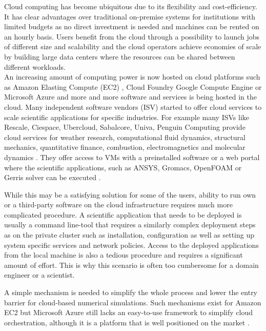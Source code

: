 \documentclass[3p,times]{elsarticle}
\begin{document}
Cloud computing has become ubiquitous due to its flexibility and cost-efficiency. It has clear advantages over traditional on-premise systems for institutions with limited budgets as no direct investment is needed and machines can be rented on an hourly basis. Users benefit from the cloud through a possibility to launch jobs of different size and scalability and the cloud operators achieve economies of scale by building large data centers where the resources can be shared between different workloads. \\
An increasing amount of computing power is now hosted on cloud platforms such as Amazon Elasting Compute (EC2) \cite{ec2}, Cloud Foundry Google Compute Engine \cite{google} or Microsoft Azure \cite{azure} and more and more software and services is being hosted in the cloud. Many independent software vendors (ISV) started to offer cloud services to scale scientific applications for specific industries. For example many ISVs like Rescale, Ciespace, Ubercloud, Sabalcore, Univa, Penguin Computing provide cloud services for weather research, computational fluid dynamics, structural mechanics, quantitative finance, combustion, electromagnetics and molecular dynamics \cite{theuebercloud}. They offer access to VMs with a preinstalled software or a web portal where the scientific applications, such as ANSYS, Gromacs, OpenFOAM or Gerris solver can be executed \cite{Popinet2003}.

While this may be a satisfying solution for some of the users, ability to run own or a third-party software on the cloud infrastructure requires much more complicated procedure. A scientific application that needs to be deployed is usually a command line-tool that requires a similarly complex deployment steps as on the private cluster such as installation, configuration as well as setting up system specific services and network policies. Access to the deployed applications from the local machine is also a tedious procedure and requires a significant amount of effort. This is why this scenario is often too cumbersome for a domain engineer or a scientist.  

A simple mechanism is needed to simplify the whole process and lower the entry barrier for cloud-based numerical simulations. Such mechanisms exist for Amazon EC2 \cite{ec2} \cite{eucalyptus} but Microsoft Azure still lacks an easy-to-use framework to simplify cloud  orchestration, although it is a platform that is well positioned on the market \cite{Garg2013}.
\end{document}
